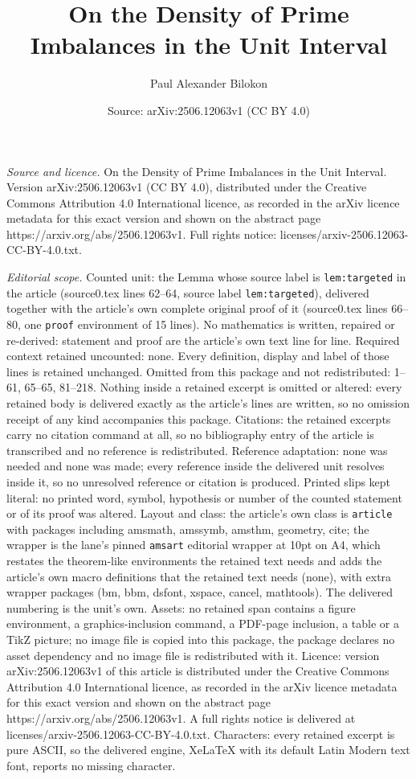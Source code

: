 \documentclass[10pt,a4paper]{amsart}
\title[On the Density of Prime Imbalances in the Unit Interval]{On the Density of Prime Imbalances in the Unit Interval}
\author{Paul Alexander Bilokon}
\date{Source: arXiv:2506.12063v1 (CC BY 4.0)}
\begin{document}
\maketitle

\noindent\emph{Source and licence.} On the Density of Prime Imbalances in the Unit Interval. Version arXiv:2506.12063v1 (CC BY 4.0), distributed under the Creative Commons Attribution 4.0 International licence, as recorded in the arXiv licence metadata for this exact version and shown on the abstract page https://arxiv.org/abs/2506.12063v1. Full rights notice: licenses/arxiv-2506.12063-CC-BY-4.0.txt.\par\smallskip

\noindent\textit{Editorial scope.} Counted unit: the Lemma whose source label is \texttt{lem:targeted} in the article (source0.tex lines 62--64, source label \texttt{lem:targeted}), delivered together with the article's own complete original proof of it (source0.tex lines 66--80, one \texttt{proof} environment of 15 lines). No mathematics is written, repaired or re-derived: statement and proof are the article's own text line for line. Required context retained uncounted: none. Every definition, display and label of those lines is retained unchanged. Omitted from this package and not redistributed: 1--61, 65--65, 81--218. Nothing inside a retained excerpt is omitted or altered: every retained body is delivered exactly as the article's lines are written, so no omission receipt of any kind accompanies this package. Citations: the retained excerpts carry no citation command at all, so no bibliography entry of the article is transcribed and no reference is redistributed. Reference adaptation: none was needed and none was made; every reference inside the delivered unit resolves inside it, so no unresolved reference or citation is produced. Printed slips kept literal: no printed word, symbol, hypothesis or number of the counted statement or of its proof was altered. Layout and class: the article's own class is \texttt{article} with packages including amsmath, amssymb, amsthm, geometry, cite; the wrapper is the lane's pinned \texttt{amsart} editorial wrapper at 10pt on A4, which restates the theorem-like environments the retained text needs and adds the article's own macro definitions that the retained text needs (none), with extra wrapper packages (bm, bbm, dsfont, xspace, cancel, mathtools). The delivered numbering is the unit's own. Assets: no retained span contains a figure environment, a graphics-inclusion command, a PDF-page inclusion, a table or a TikZ picture; no image file is copied into this package, the package declares no asset dependency and no image file is redistributed with it. Licence: version arXiv:2506.12063v1 of this article is distributed under the Creative Commons Attribution 4.0 International licence, as recorded in the arXiv licence metadata for this exact version and shown on the abstract page https://arxiv.org/abs/2506.12063v1. A full rights notice is delivered at licenses/arxiv-2506.12063-CC-BY-4.0.txt. Characters: every retained excerpt is pure ASCII, so the delivered engine, XeLaTeX with its default Latin Modern text font, reports no missing character.
\end{document}
